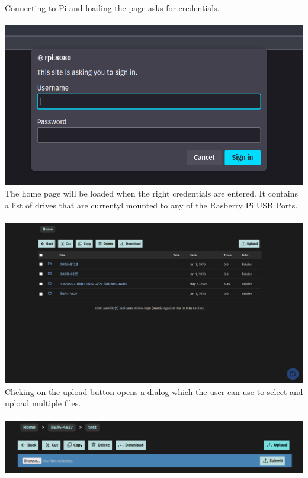 \documentclass[12pt]{article}
\begin{document}
Connecting to Pi and loading the page asks for credentials. \\ \\
\includegraphics[width=\linewidth]{ss/1.cm-login.png} \\

The home page will be loaded when the right credentials are entered. It contains a list of drives that are currentyl mounted to any of the Rasberry Pi USB Ports. \\ \\
\includegraphics[width=\linewidth]{ss/2.cm-home.png} \\

Clicking on the upload button opens a dialog which the user can use to select and upload multiple files. \\ \\
\includegraphics[width=\linewidth]{ss/3.cm-upload.png} \\
\end{document}
